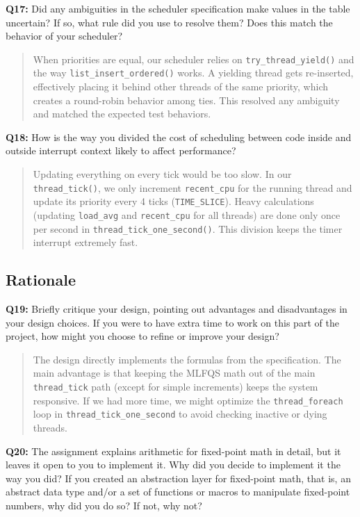 \documentclass[a4paper,11pt]{paper}
\begin{document}
\textbf{Q17:} Did any ambiguities in the scheduler specification make values in
the table uncertain?  If so, what rule did you use to resolve them?  Does this
match the behavior of your scheduler?

\begin{quote}
  When priorities are equal, our scheduler relies on \texttt{try\_thread\_yield()} and the way \texttt{list\_insert\_ordered()} works. A yielding thread gets re-inserted, effectively placing it behind other threads of the same priority, which creates a round-robin behavior among ties. This resolved any ambiguity and matched the expected test behaviors.
\end{quote}


\textbf{Q18:} How is the way you divided the cost of scheduling between code
inside and outside interrupt context likely to affect performance?

\begin{quote}
  Updating everything on every tick would be too slow. In our \texttt{thread\_tick()}, we only increment \texttt{recent\_cpu} for the running thread and update its priority every 4 ticks (\texttt{TIME\_SLICE}). Heavy calculations (updating \texttt{load\_avg} and \texttt{recent\_cpu} for all threads) are done only once per second in \texttt{thread\_tick\_one\_second()}. This division keeps the timer interrupt extremely fast.
\end{quote}

\subsection{Rationale}

\textbf{Q19:} Briefly critique your design, pointing out advantages and
disadvantages in your design choices.  If you were to have extra time to work on
this part of the project, how might you choose to refine or improve your design?

\begin{quote}
  The design directly implements the formulas from the specification. The main advantage is that keeping the MLFQS math out of the main \texttt{thread\_tick} path (except for simple increments) keeps the system responsive. If we had more time, we might optimize the \texttt{thread\_foreach} loop in \texttt{thread\_tick\_one\_second} to avoid checking inactive or dying threads.
\end{quote}

\textbf{Q20:} The assignment explains arithmetic for fixed-point math in detail,
but it leaves it open to you to implement it.  Why did you decide to implement
it the way you did?  If you created an abstraction layer for fixed-point math,
that is, an abstract data type and/or a set of functions or macros to manipulate
fixed-point numbers, why did you do so?  If not, why not?
\end{document}
